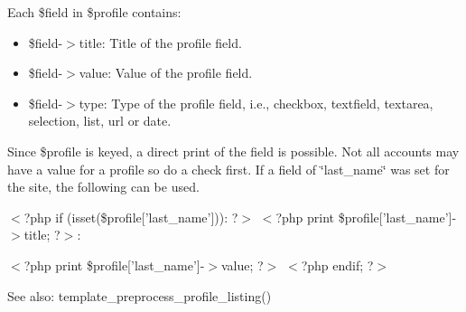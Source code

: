 Each \$field in \$profile contains:\begin{itemize}
\item \$field-$>$title: Title of the profile field.\item \$field-$>$value: Value of the profile field.\item \$field-$>$type: Type of the profile field, i.e., checkbox, textfield, textarea, selection, list, url or date.\end{itemize}


Since \$profile is keyed, a direct print of the field is possible. Not all accounts may have a value for a profile so do a check first. If a field of \char`\"{}last\_\-name\char`\"{} was set for the site, the following can be used.

$<$?php if (isset(\$profile\mbox{[}'last\_\-name'\mbox{]})): ?$>$  $<$?php print \$profile\mbox{[}'last\_\-name'\mbox{]}-$>$title; ?$>$:\par
 $<$?php print \$profile\mbox{[}'last\_\-name'\mbox{]}-$>$value; ?$>$  $<$?php endif; ?$>$

\begin{Desc}
\item[See also:]template\_\-preprocess\_\-profile\_\-listing() \end{Desc}
